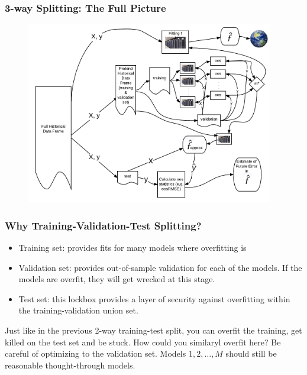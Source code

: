\documentclass[handout]{beamer}
\begin{document}
\begin{frame}\frametitle{3-way Splitting: The Full Picture}
\vspace{-0.8cm}
\begin{figure}
\centering
\includegraphics[width=4.26in]{3_way_validation}
\end{figure}
	
\end{frame}

\begin{frame}\frametitle{Why Training-Validation-Test Splitting?}

\begin{itemize}
\item Training set: \pause provides fits for many models where overfitting is 
\item Validation set: \pause provides out-of-sample validation for each of the models. If the models are overfit, they will get wrecked at this stage.
\item Test set: \pause this lockbox provides a layer of security against overfitting within the training-validation union set. \pause
\end{itemize}

Just like in the previous 2-way training-test split, you can overfit the training, get killed on the test set and be stuck. How could you similaryl overfit here? \pause Be careful of optimizing to the validation set. Models $1, 2, \ldots, M$ should still be reasonable thought-through models.


\end{frame}
\end{document}
